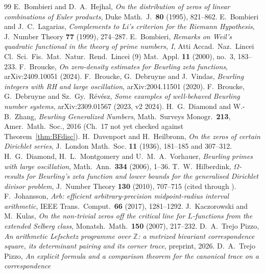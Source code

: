 \documentclass[11pt]{amsart}
\theoremstyle{definition}
\theoremstyle{remark}
\newcommand{\Z}{\mathbb Z}
\begin{document}
\begin{thebibliography}{99}
 E.~Bombieri and D.~A.~Hejhal, \emph{On the distribution of zeros of linear combinations of Euler products}, Duke Math.~J.\ \textbf{80} (1995), 821--862.
 E.~Bombieri and J.~C.~Lagarias, \emph{Complements to Li's criterion
for the Riemann Hypothesis}, J.~Number Theory \textbf{77} (1999), 274--287.
 E.~Bombieri, \emph{Remarks on Weil's quadratic functional in the theory of
prime numbers, I}, Atti Accad.~Naz.~Lincei Cl.~Sci.~Fis.~Mat.~Natur.~Rend.~Lincei (9) Mat.~Appl.
\textbf{11} (2000), no.~3, 183--233.
 F.~Broucke, \emph{On zero-density estimates for Beurling zeta functions}, arXiv:2409.10051 (2024).
 F.~Broucke, G.~Debruyne and J.~Vindas, \emph{Beurling integers with RH and large oscillation}, arXiv:2004.11501 (2020).
 F.~Broucke, G.~Debruyne and Sz.~Gy.~R\'ev\'esz, \emph{Some examples of well-behaved Beurling number systems}, arXiv:2309.01567 (2023, v2 2024).
 H.~G.~Diamond and W.-B.~Zhang, \emph{Beurling Generalized Numbers}, Math.\ Surveys Monogr.\ \textbf{213}, Amer.\ Math.\ Soc., 2016 (Ch.~17 not yet checked against Theorem~\ref{thm:BFdisc}).
 H.~Davenport and H.~Heilbronn, \emph{On the zeros of certain
Dirichlet series}, J.~London Math.~Soc. \textbf{11} (1936), 181--185 and 307--312.
 H.~G.~Diamond, H.~L.~Montgomery and U.~M.~A.~Vorhauer, \emph{Beurling primes with
large oscillation}, Math.~Ann.\ \textbf{334} (2006), 1--36.
 T.~W.~Hilberdink, \emph{$\Omega$-results for Beurling's zeta function and lower bounds for the generalised Dirichlet divisor problem}, J.~Number Theory \textbf{130} (2010), 707--715 (cited through \cite{Revesz2023}).
 F.~Johansson, \emph{Arb: efficient arbitrary-precision midpoint-radius interval
arithmetic}, IEEE Trans.\ Comput.\ \textbf{66} (2017), 1281--1292.
 J.~Kaczorowski and M.~Kulas, \emph{On the non-trivial zeros off the critical line for $L$-functions from the extended Selberg class}, Monatsh.\ Math.\ \textbf{150} (2007), 217--232. %
 D.~A.~Trejo Pizzo, \emph{An arithmetic Lefschetz programme over $\Z$: a metrized
bivariant correspondence square, its determinant pairing and its corner trace}, preprint, 2026.
 D.~A.~Trejo Pizzo, \emph{An explicit formula and a comparison theorem for the canonical trace on a correspondence
}
\end{thebibliography}
\end{document}
